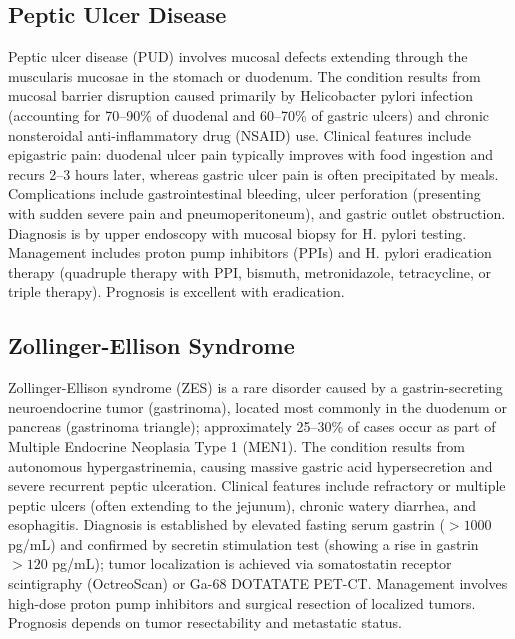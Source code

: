 \subsection{Peptic Ulcer Disease}
\label{sec:Peptic Ulcer Disease}
Peptic ulcer disease (PUD) involves mucosal defects extending through the muscularis mucosae in the stomach or duodenum. The condition results from mucosal barrier disruption caused primarily by Helicobacter pylori infection (accounting for 70--90\% of duodenal and 60--70\% of gastric ulcers) and chronic nonsteroidal anti-inflammatory drug (NSAID) use. Clinical features include epigastric pain: duodenal ulcer pain typically improves with food ingestion and recurs 2--3 hours later, whereas gastric ulcer pain is often precipitated by meals. Complications include gastrointestinal bleeding, ulcer perforation (presenting with sudden severe pain and pneumoperitoneum), and gastric outlet obstruction. Diagnosis is by upper endoscopy with mucosal biopsy for H. pylori testing. Management includes proton pump inhibitors (PPIs) and H. pylori eradication therapy (quadruple therapy with PPI, bismuth, metronidazole, tetracycline, or triple therapy). Prognosis is excellent with eradication.


\subsection{Zollinger-Ellison Syndrome}
\label{sec:Zollinger-Ellison Syndrome}
Zollinger-Ellison syndrome (ZES) is a rare disorder caused by a gastrin-secreting neuroendocrine tumor (gastrinoma), located most commonly in the duodenum or pancreas (gastrinoma triangle); approximately 25--30\% of cases occur as part of Multiple Endocrine Neoplasia Type 1 (MEN1). The condition results from autonomous hypergastrinemia, causing massive gastric acid hypersecretion and severe recurrent peptic ulceration. Clinical features include refractory or multiple peptic ulcers (often extending to the jejunum), chronic watery diarrhea, and esophagitis. Diagnosis is established by elevated fasting serum gastrin ($>1000$ pg/mL) and confirmed by secretin stimulation test (showing a rise in gastrin $>120$ pg/mL); tumor localization is achieved via somatostatin receptor scintigraphy (OctreoScan) or Ga-68 DOTATATE PET-CT. Management involves high-dose proton pump inhibitors and surgical resection of localized tumors. Prognosis depends on tumor resectability and metastatic status.


